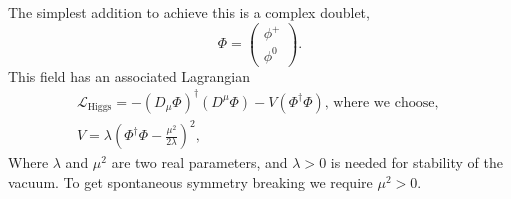 The simplest addition to achieve this is a complex doublet,
\begin{equation}\label{eqn:phi_hfield}
\Phi = \begin{pmatrix} \phi^{+} \\
\phi^{0} \end{pmatrix}.
\end{equation}
This field has an associated Lagrangian
\begin{equation}\label{eqn:higgs_gen_lag}
\begin{split}
\mathcal{L}_{\text{Higgs}} = -(D_{\mu}\Phi)^{\dagger}(D^{\mu}\Phi) - V(\Phi^{\dagger}\Phi) \text{, where we choose, }\\
V = \lambda(\Phi^{\dagger}\Phi - \frac{\mu^2}{2\lambda})^2,
\end{split}
\end{equation}
Where $\lambda$ and $\mu^2$ are two real parameters, and $\lambda>0$ is needed for stability
of the vacuum. To get spontaneous symmetry breaking we require $\mu^2>0$.

